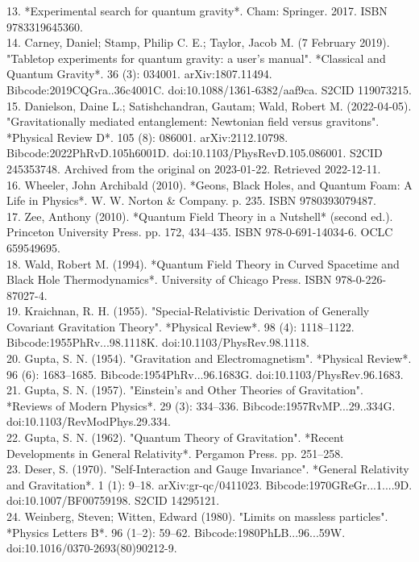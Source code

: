 13. *Experimental search for quantum gravity*. Cham: Springer. 2017. ISBN 9783319645360.\\
14. Carney, Daniel; Stamp, Philip C. E.; Taylor, Jacob M. (7 February 2019). "Tabletop experiments for quantum gravity: a user's manual". *Classical and Quantum Gravity*. 36 (3): 034001. arXiv:1807.11494. Bibcode:2019CQGra..36c4001C. doi:10.1088/1361-6382/aaf9ca. S2CID 119073215.\\
15. Danielson, Daine L.; Satishchandran, Gautam; Wald, Robert M. (2022-04-05). "Gravitationally mediated entanglement: Newtonian field versus gravitons". *Physical Review D*. 105 (8): 086001. arXiv:2112.10798. Bibcode:2022PhRvD.105h6001D. doi:10.1103/PhysRevD.105.086001. S2CID 245353748. Archived from the original on 2023-01-22. Retrieved 2022-12-11.\\
16. Wheeler, John Archibald (2010). *Geons, Black Holes, and Quantum Foam: A Life in Physics*. W. W. Norton & Company. p. 235. ISBN 9780393079487.\\
17. Zee, Anthony (2010). *Quantum Field Theory in a Nutshell* (second ed.). Princeton University Press. pp. 172, 434–435. ISBN 978-0-691-14034-6. OCLC 659549695.\\
18. Wald, Robert M. (1994). *Quantum Field Theory in Curved Spacetime and Black Hole Thermodynamics*. University of Chicago Press. ISBN 978-0-226-87027-4.\\
19. Kraichnan, R. H. (1955). "Special-Relativistic Derivation of Generally Covariant Gravitation Theory". *Physical Review*. 98 (4): 1118–1122. Bibcode:1955PhRv...98.1118K. doi:10.1103/PhysRev.98.1118.\\
20. Gupta, S. N. (1954). "Gravitation and Electromagnetism". *Physical Review*. 96 (6): 1683–1685. Bibcode:1954PhRv...96.1683G. doi:10.1103/PhysRev.96.1683.\\
21. Gupta, S. N. (1957). "Einstein's and Other Theories of Gravitation". *Reviews of Modern Physics*. 29 (3): 334–336. Bibcode:1957RvMP...29..334G. doi:10.1103/RevModPhys.29.334.\\
22. Gupta, S. N. (1962). "Quantum Theory of Gravitation". *Recent Developments in General Relativity*. Pergamon Press. pp. 251–258.\\
23. Deser, S. (1970). "Self-Interaction and Gauge Invariance". *General Relativity and Gravitation*. 1 (1): 9–18. arXiv:gr-qc/0411023. Bibcode:1970GReGr...1....9D. doi:10.1007/BF00759198. S2CID 14295121.\\
24. Weinberg, Steven; Witten, Edward (1980). "Limits on massless particles". *Physics Letters B*. 96 (1–2): 59–62. Bibcode:1980PhLB...96...59W. doi:10.1016/0370-2693(80)90212-9. \\
